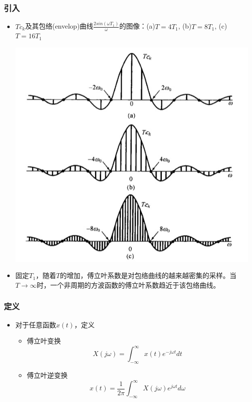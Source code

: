 \documentclass[CJKutf8,xcolor=pdftex,dvipsnames,table]{beamer}
\begin{document}
\begin{CJK*}{UTF8}{song}
  \begin{frame}
    \frametitle{引入}
    \begin{itemize}
    \item $Tc_k$及其包络(envelop)曲线$\frac{2sin(\omega T_1)}{\omega}$的图像：(a)$T=4T_1$, (b)$T=8T_1$, (c)$T=16T_1$
		    \begin{center}
		   	\includegraphics[scale=.27]{ss-c-f4-2}
    		\end{center}
	\item 固定$T_1$，随着$T$的增加，傅立叶系数是对包络曲线的越来越密集的采样。当$T \to \infty$时，一个非周期的方波函数的傅立叶系数趋近于该包络曲线。
    \end{itemize}

  \end{frame}    
   
  \begin{frame}
    \frametitle{定义}
    \begin{itemize}
    \item 对于任意函数$x(t)$，定义
    \begin{itemize}
    	\item 傅立叶变换
    	\[
			X(j\omega) = \int_{-\infty}^{\infty}x(t)e^{-j\omega t}dt    
    	\]
    	\item 傅立叶逆变换
    	\[
			x(t) = \frac{1}{2\pi}\int_{-\infty}^{\infty}X(j\omega)e^{j\omega t}d\omega    
    	\]    
    	\end{itemize}
    \end{itemize}


\end{frame}
\end{CJK*}
\end{document}
